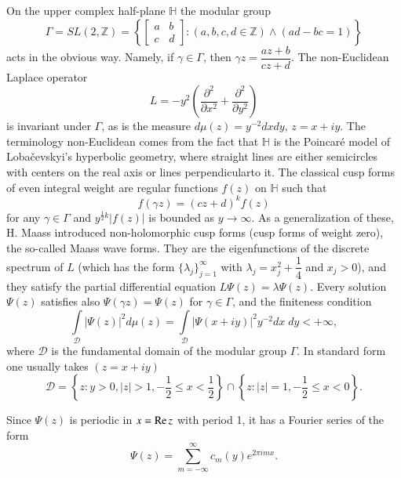On the upper complex half-plane $\mathbb{H}$ the modular group
$$
\Gamma = SL (2, \mathbb{Z}) = \left\{ 
\begin{bmatrix} 
a & b \\ 
c & d 
\end{bmatrix} :  (a,b,c,d \in \mathbb{Z}) \wedge (ad - bc =1)\right\}
$$
acts in the obvious way. Namely, if $\gamma \in \Gamma$, then $\gamma z = \dfrac{az+b}{cz+d}$. The non-Euclidean Laplace operator
$$
L = - y^2 \left( \frac{\partial^2}{\partial x^2} + \frac{\partial^2}{\partial y^2} \right)
$$
is invariant under $\Gamma$, as is the measure $d\mu(z) = y^{-2} dx
dy$, $z = x + iy$. The terminology non-Euclidean comes from the fact
that $\mathbb{H}$ is the Poincar\'e model of Loba\v cevskyi's
hyperbolic geometry, where straight lines are either semicircles with
centers on the real axis or lines perpendicular\pageoriginale to
it. The classical cusp forms of even integral weight are regular
functions $f(z)$ on $\mathbb{H}$ such that  
$$
f(\gamma z) = (cz + d)^k f (z)
$$
for any $\gamma \in \Gamma$ and $y^{\frac{1}{2}k} |f(z)|$ is bounded
as $y \to \infty$. As a generalization of these, H. Maass introduced
non-holomorphic cusp forms (cusp forms of weight zero), the so-called
Maass wave forms. They are the eigenfunctions of the discrete spectrum
of $L$ (which has the form $\{\lambda_j\}^{\infty}_{j=1}$ with
$\lambda_j = x^2_j + \dfrac{1}{4}$ and $x_j > 0$), and they satisfy
the partial differential equation $L\Psi (z) = \lambda \Psi
(z)$. Every solution $\Psi (z)$ satisfies also $\Psi (\gamma z) = \Psi
(z)$ for $\gamma \in \Gamma$, and the finiteness condition 
$$ 
\int\limits_{\mathscr{D}} |\Psi (z)|^2 d\mu (z) =
\int\limits_{\mathscr{D}} |\Psi (x+ i y)|^2 y^{-2} dx \; dy < +
\infty, 
$$
where $\mathscr{D}$ is the fundamental domain of the modular group
$\Gamma$. In standard form one usually takes $(z = x + iy)$ 
$$
\mathscr{D} = \left\{ z : y >  0, |z| > 1, -\frac{1}{2} \leq x <
\frac{1}{2}\right\} \cap \left\{z : |z| = 1, -\frac{1}{2}  \leq x < 0
\right\}. 
$$

Since $\Psi(z)$ is periodic in $x = \operatorname{Re} z$ with period 1, it has a
Fourier series of the form  
$$
\Psi (z) = \sum\limits^\infty_{m=-\infty} c_m(y) e^{2\pi i mx}.
$$

